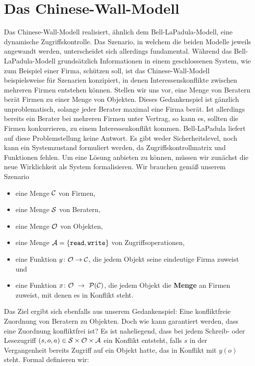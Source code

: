 \section{Das Chinese-Wall-Modell}\indexChineseWall
Das Chinese-Wall-Modell realisiert, ähnlich dem Bell-LaPadula-Modell, eine dynamische Zugriffskontrolle. Das Szenario, in welchem die beiden Modelle jeweils angewandt werden, unterscheidet sich allerdings fundamental.
Während das Bell-LaPadula-Modell grundsätzlich Informationen in einem geschlossenen System, wie zum Beispiel einer Firma, schützen soll, ist das Chinese-Wall-Modell beispielsweise für Szenarien konzipiert, in denen Interessenskonflikte zwischen mehreren Firmen entstehen können.
Stellen wir uns vor, eine Menge von Beratern berät Firmen zu einer Menge von Objekten. Dieses Gedankenspiel ist gänzlich unproblematisch, solange jeder Berater maximal eine Firma berät. Ist allerdings bereits ein Berater bei mehreren Firmen unter Vertrag, so kann es, sollten die Firmen konkurrieren, zu einem Interessenkonflikt kommen. Bell-LaPadula liefert auf diese Problemstellung keine Antwort. Es gibt weder Sicherheitslevel, noch kann ein Systemzustand formuliert werden, da Zugriffskontrollmatrix und Funktionen fehlen.
Um eine Lösung anbieten zu können, müssen wir zunächst die neue Wirklichkeit als System formalisieren. Wir brauchen gemäß unserem Szenario

\begin{itemize}
	\item eine Menge $\mathcal{C}$ von Firmen,
	\item eine Menge $\mathcal{S}$ von Beratern,
	\item eine Menge $\mathcal{O}$ von Objekten,
	\item eine Menge $\mathcal{A} = \{\texttt{read}, \texttt{write}\}$ von Zugriffsoperationen, 
	\item eine Funktion $y\colon \mathcal{O} \rightarrow \mathcal{C}$, die jedem Objekt seine eindeutige Firma zuweist und
	\item eine Funktion $x\colon \calO\ \rArrow\ \calP(\calC)$, die jedem Objekt die \textbf{Menge} an Firmen zuweist, mit denen es in Konflikt steht.
\end{itemize}

Das Ziel ergibt sich ebenfalls aus unserem Gedankenspiel: Eine konfliktfreie Zuordnung von Beratern zu Objekten. Doch wie kann garantiert werden, dass eine Zuordnung konfliktfrei ist? %
Es ist naheliegend, dass bei jedem Schreib- oder Lesezugriff $(s, o, a) \in \mathcal{S} \times \mathcal{O} \times \mathcal{A}$ ein Konflikt entsteht, falls \(s\) in der Vergangenheit bereits Zugriff auf ein Objekt hatte, das in Konflikt mit \(y(o)\) steht. Formal definieren wir: 

